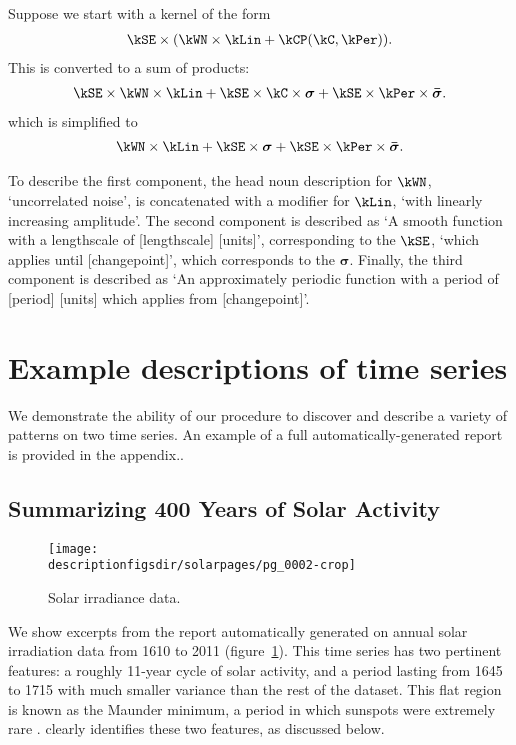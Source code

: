 Suppose we start with a kernel of the form
\begin{align*}
\kSE \times (\kWN \times \kLin + \kCP(\kC, \kPer)).
\end{align*}
This is converted to a sum of products:
\begin{align*}
\kSE \times \kWN \times \kLin + \kSE \times \kC \times \boldsymbol{\sigma} + \kSE \times \kPer \times \boldsymbol{\bar\sigma}.
\end{align*}
which is simplified to
\begin{align*}
\kWN \times \kLin + \kSE \times \boldsymbol{\sigma} + \kSE \times \kPer \times \boldsymbol{\bar\sigma}.
\end{align*}

To describe the first component, the head noun description for $\kWN$, `uncorrelated noise', is concatenated with a modifier for $\kLin$, `with linearly increasing amplitude'.
The second component is described as `A smooth function with a lengthscale of [lengthscale] [units]', corresponding to the $\kSE$, `which applies until [changepoint]', which corresponds to the $\boldsymbol{\sigma}$.
Finally, the third component is described as `An approximately periodic function with a period of [period] [units] which applies from [changepoint]'.


\section{Example descriptions of time series}
\label{sec:examples}
We demonstrate the ability of our procedure to discover and describe a variety of patterns on two time series.
An example of a full automatically-generated report is provided in the appendix..

\subsection{Summarizing 400 Years of Solar Activity}
\label{sec:solar}

\begin{figure}[h]
\centering
\texttt{[image: \\descriptionfigsdir/solarpages/pg\_0002-crop]}
\caption[Solar irradiance data]{
Solar irradiance data.}
\label{fig:solar}
\end{figure}

We show excerpts from the report automatically generated on annual solar irradiation data from 1610 to 2011 (figure~\ref{fig:solar}).
This time series has two pertinent features: a roughly 11-year cycle of solar activity, and a period lasting from 1645 to 1715 with much smaller variance than the rest of the dataset.
This flat region is known as the Maunder minimum, a period in which sunspots were extremely rare \citep{Lean1995-vp}.
\procedurename{} clearly identifies these two features, as discussed below.

